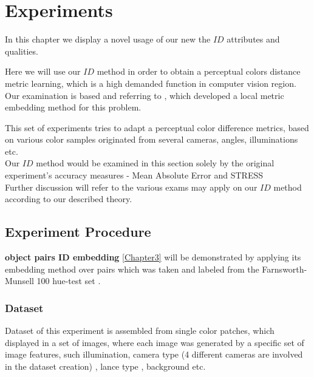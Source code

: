 
\chapter{Experiments} %

\label{Chapter8}

In this chapter we display a novel usage of our new the $ID$ attributes and qualities.

Here we will use our $ID$ method in order to obtain a perceptual colors distance metric learning, which is a high demanded function in computer vision region. Our examination is based and referring to \cite{perp_color}, which developed a local metric embedding method for this problem. 

This set of experiments tries to adapt a perceptual color difference metrics, based on various color samples originated from several cameras, angles, illuminations etc.
\\

Our $ID$ method would be examined in this section solely by the original experiment's accuracy measures - Mean Absolute Error \cite{MAE} and STRESS \cite{STRESS}
\\
Further discussion will refer to the various exams may apply on our $ID$ method according to our described theory.

\section{Experiment Procedure}



\textbf{object pairs ID embedding} \ref{Chapter3} will be demonstrated by applying its embedding method over pairs which was taken and labeled from the Farnsworth-Munsell 100 hue-test set \cite{furnsworth}.
\subsection{Dataset}

Dataset of this experiment is assembled from single color patches, which displayed in a set of images, where each image was generated by a specific set of image features, such illumination, camera type (4 different cameras are involved in the dataset creation) , lance type , background etc.

